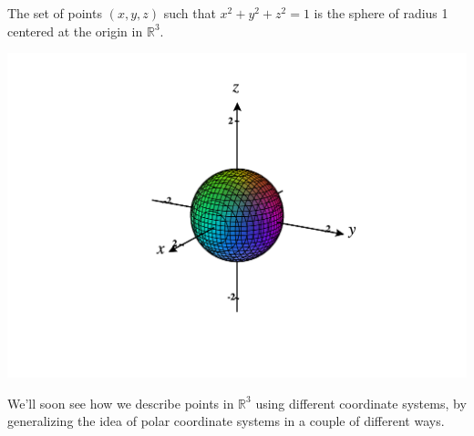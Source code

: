 \documentclass{ximera}
\begin{document}
\begin{example}
The set of points $(x,y,z)$ such that $x^2+y^2+z^2 = 1$ is the sphere of radius 1 centered at the origin in $\mathbb{R}^3$.

\begin{image}
\includegraphics[width=\textwidth]{CalcPlot3D-unit_sphere}
\end{image}

\end{example}

We'll soon see how we describe points in $\mathbb{R}^3$ using different coordinate systems, by generalizing the idea of polar coordinate systems in a couple of different ways.
\end{document}
